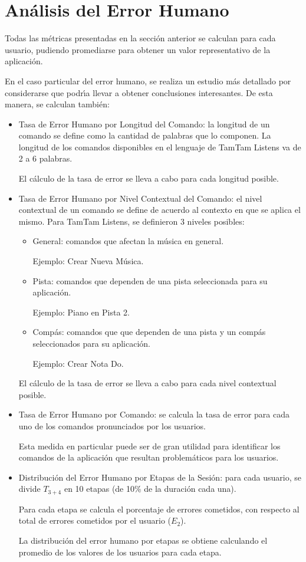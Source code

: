 \section{An\'alisis del Error Humano}
\label{sec:evaluacionError}
Todas las m\'etricas presentadas en la secci\'on anterior se calculan para cada usuario,
pudiendo promediarse para obtener un valor representativo de la aplicaci\'on.

En el caso particular del error humano, se realiza un estudio m\'as detallado
por considerarse que podr{\'\i}a llevar a obtener conclusiones interesantes. De esta manera,
se calculan tambi\'en:

\begin{itemize}
	\item Tasa de Error Humano por Longitud del Comando: la longitud de un comando se define
	como la cantidad de palabras que lo componen. La longitud de los comandos disponibles en el 
	lenguaje de TamTam Listens va de 2 a 6 palabras.

	El c\'alculo de la tasa de error se lleva a cabo para cada longitud posible.  


	\item Tasa de Error Humano por Nivel Contextual del Comando: el nivel contextual de un comando
	se define de acuerdo al contexto en que se aplica el mismo.
	Para TamTam Listens, se definieron 3 niveles posibles:
		\begin{itemize}
			\item General: comandos que afectan la m\'usica en general. 

			Ejemplo: Crear Nueva M\'usica.
			\item Pista: comandos que dependen de una pista seleccionada para su aplicaci\'on. 

			Ejemplo: Piano en Pista 2.
			\item Comp\'as: comandos que que dependen de una pista y un comp\'as seleccionados 
			para su aplicaci\'on. 

			Ejemplo: Crear Nota Do.
		\end{itemize}
	
		
	El c\'alculo de la tasa de error se lleva a cabo para cada nivel contextual posible.

	\item Tasa de Error Humano por Comando: se calcula la tasa de error para cada uno
	de los comandos pronunciados por los usuarios.

	Esta medida en particular puede ser de gran utilidad para identificar los comandos de la
	aplicaci\'on que resultan problem\'aticos para los usuarios.
	
	\item Distribuci\'on del Error Humano por Etapas de la Sesi\'on: para cada usuario, 
	se divide $T_{3+4}$ en 10 etapas (de 10\% de la duraci\'on cada una).

	Para cada etapa se calcula el porcentaje de errores cometidos, con respecto al total de
	errores cometidos por el usuario ($E_2$).

	La distribuci\'on del error humano por etapas se obtiene calculando 
	el promedio de los valores de los usuarios para cada etapa.
   
\end{itemize}